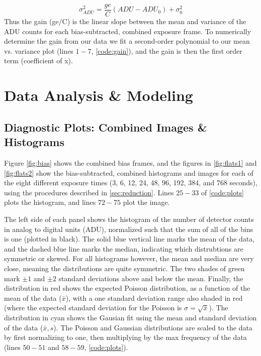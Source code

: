 \documentclass[preprint]{aastex62}
\begin{document}
\begin{equation}
\sigma_{ADU}^2 = \frac{ge}{C} \left(ADU - ADU_0 \right) + \sigma_0^2
\end{equation}
Thus the gain (ge/C) is the linear slope between the mean and variance of the ADU counts for each bias-subtracted, combined exposure frame. To numerically determine the gain from our data we fit a second-order polynomial to our mean vs. variance plot (lines $1-7$, \ref{code:gain}), and the gain is then the first order term (coefficient of x).

\section{Data Analysis \& Modeling}

\subsection{Diagnostic Plots: Combined Images \& Histograms} \label{subsec:diagnostic}
Figure \ref{fig:bias} shows the combined bias frames, and the figures in \ref{fig:flats1} and \ref{fig:flats2} show the bias-subtracted, combined histograms and images for each of the eight different exposure times (3, 6, 12, 24, 48, 96, 192, 384, and 768 seconds), using the procedures described in \ref{sec:reduction}. Lines $25-33$ of \ref{code:plots} plots the histogram, and lines $72-75$ plot the image.

The left side of each panel shows the histogram of the number of detector counts in analog to digital units (ADU), normalized such that the sum of all of the bins is one (plotted in black). The solid blue vertical line marks the mean of the data, and the dashed blue line marks the median, indicating which distrubtions are symmetric or skewed. For all histograms however, the mean and median are very close, meaning the distributions are quite symmetric. The two shades of green mark $\pm1$ and $\pm2$ standard deviations above and below the mean. Finally, the distribution in red shows the expected Poisson distribution, as a function of the mean of the data ($\bar{x}$), with a one standard deviation range also shaded in red (where the expected standard deviation for the Poisson is $\sigma=\sqrt{\bar{x}}$). The distribution in cyan shows the Gausian fit using the mean and standard deviation of the data ($\bar{x}, s$). The Poisson and Gaussian distributions are scaled to the data by first normalizing to one, then multiplying by the max frequency of the data (lines $50-51$ and $58-59$, \ref{code:plots}).
\end{document}
